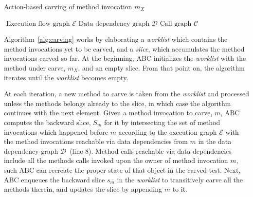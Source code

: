 \documentclass[10pt,conference]{IEEEtran}
\makeatletter
\newcommand{\algrule}[1][.2pt]{\par\vskip.5\baselineskip\hrule height #1\par\vskip.5\baselineskip}
\newcommand{\worklist}{\textit{worklist}\xspace}
\gdef\xxx{\@ifnextchar[\xxx@lab\xxx@nolab}
\newcommand{\abc}{\textsf{ABC}\xspace}
\makeatother
\begin{document}
\begin{algorithm}
\caption{Action-based carving of method invocation $m_X$}\label{alg:carving}
\begin{algorithmic}
\REQUIRE$ $
\STATE$\text{Execution flow graph } \mathcal{E}$
\STATE$\text{Data dependency graph } \mathcal{D}$
\STATE$\text{Call graph } \mathcal{C}$%
\end{algorithmic}
\end{algorithm}

Algorithm~\ref{alg:carving} works by elaborating a \worklist which contains the method invocations yet to be carved,
and a \emph{slice}, which accumulates the method invocations carved so far.
At the beginning, \abc initializes the \worklist with the method under carve, $m_X$, and an empty slice.
From that point on, the algorithm iterates until the \worklist becomes empty.

At each iteration, a new method to carve is taken from the \worklist and processed unless the methods
belongs already to the slice, in which case the algorithm continues with the next element.
%
Given a method invocation to carve, $m$, \abc computes the backward slice, $S_m$ for it by intersecting the set of
method invocations which happened before $m$ according to the execution graph $\mathcal{E}$ with
the method invocations reachable via data dependencies from $m$ in the data dependency graph $\mathcal{D}$~(line 8). 
Method calls reachable via data dependencies include all the methods calls invoked upon
the owner of method invocation $m$, such \abc can recreate the proper state of that object in the carved test.
%
Next, \abc enqueues the backward slice $s_m$ in the \worklist to transitively carve all the methods therein, and
updates the slice by appending $m$ to it.
\end{document}
